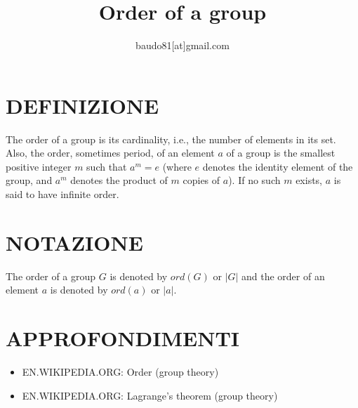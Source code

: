 \documentclass[a4paper,10pt]{article}
\title{Order of a group}
\author{baudo81[at]gmail.com}
\begin{document}
\maketitle

\section{DEFINIZIONE}
The order of a group is its cardinality, i.e., the number of elements in its set. Also, the order, sometimes period, of an element
$a$ of a group is the smallest positive integer $m$ such that $a^m=e$ (where $e$ denotes the identity element of the group, and $a^m$
denotes the product of $m$ copies of $a$). If no such $m$ exists, $a$ is said to have infinite order.

\section{NOTAZIONE}
The order of a group $G$ is denoted by $ord(G)$ or $|G|$ and the order of an element $a$ is denoted by $ord(a)$ or $|a|$. 

\section{APPROFONDIMENTI}
\begin{itemize}
 \item EN.WIKIPEDIA.ORG: Order (group theory) \cite{orderofgroup1}
 \item EN.WIKIPEDIA.ORG: Lagrange's theorem (group theory) \cite{orderofgroup2}
\end{itemize}




\end{document}
